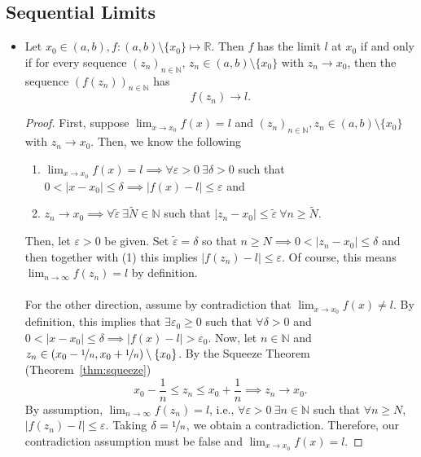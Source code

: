 \documentclass{article}
\newcommand{\R}{\mathbb{R}}
\newcommand{\N}{\mathbb{N}}
\newcommand{\seq}[2]{(#1_{#2})_{#2 \in \N}}
\newcommand{\?}{\stackrel{?}{=}}
\theoremstyle{definition} %
\begin{document}
\subsection{Sequential Limits}

\begin{itemize}
    \item[]
          \begin{proposition}
              Let $x_0 \in (a, b), f: (a, b) \setminus \{x_0\} \mapsto \R$. Then $f$ has the limit $l$ at $x_0$ if and only if for every sequence $\seq{z}{n}$, $z_n \in (a, b) \setminus \{x_0\}$ with $z_n \rightarrow x_0$, then the sequence $(f(z_n))_{n \in \N}$ has
              $$f(z_n) \rightarrow l.$$
              \label{prop:seq_lim}
          \end{proposition}
          \begin{proof}
              First, suppose $\lim_{x \to x_0} f(x) = l$ and $\seq{z}{n}, z_n \in (a, b) \setminus \{x_0\}$ with $z_n \rightarrow x_0$. Then, we know the following
              \begin{enumerate}[label=(\arabic*)]
                  \item $\lim_{x \to x_0} f(x) = l \implies \forall \varepsilon > 0 \ \exists \delta > 0$ such that $0 < |x - x_0| \leq \delta \implies |f(x) - l| \leq \varepsilon$ and
                  \item $z_n \rightarrow x_0 \implies \forall \widetilde{\varepsilon} \ \exists \widetilde{N} \in \N$ such that $|z_n - x_0| \leq \widetilde{\varepsilon} \ \forall n \geq \widetilde{N}$.
              \end{enumerate}
              Then, let $\varepsilon > 0$ be given. Set $\widetilde{\varepsilon} = \delta$ so that $n \geq N \implies 0 < |z_n - x_0| \leq \delta$ and then together with (1) this implies $|f(z_n) - l| \leq \varepsilon$. Of course, this means $\lim_{n \to \infty} f(z_n) = l$ by definition. \\\\
              For the other direction, assume by contradiction that $\lim_{x \to x_0} f(x) \neq l$. By definition, this implies that $\exists \varepsilon_0 \geq 0$ such that $\forall \delta > 0$ and $0 < |x - x_0| \leq \delta \implies |f(x) - l| > \varepsilon_0$. Now, let $n \in \N$ and $z_n \in (x_0 - \nicefrac{1}{n}, x_0 + \nicefrac{1}{n}) \setminus \{x_0\}$. By the Squeeze Theorem (Theorem~\ref{thm:squeeze})
              $$x_0 - \frac{1}{n} \leq z_n \leq x_0 + \frac{1}{n} \implies z_n \rightarrow x_0.$$
              By assumption, $\lim_{n \to \infty} f(z_n) = l$, i.e., $\forall \varepsilon > 0 \ \exists n \in \N$ such that $\forall n \geq N$, $|f(z_n) - l| \leq \varepsilon$. Taking $\delta = \nicefrac{1}{n}$, we obtain a contradiction. Therefore, our contradiction assumption must be false and $\lim_{x \to x_0} f(x) = l$.

\end{proof}
\end{itemize}
\end{document}

